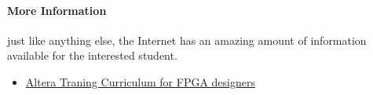 \documentclass[12pt,journal]{IEEEtran}
\begin{document}
    \paragraph{More Information} just like anything else, the Internet has an amazing amount of information available
    for the interested student. 
      \begin{itemize}
        \item \href{http://www.altera.com/education/training/curriculum/fpga/trn-fpga.html}{Altera Traning Curriculum for FPGA designers}
      \end{itemize}

  
  
\end{document}

